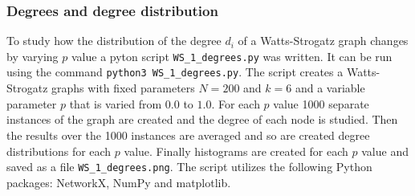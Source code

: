 \subsubsection{Degrees and degree distribution}

To study how the distribution of the degree $d_i$ of a Watts-Strogatz graph changes by varying $p$ value a pyton script \verb+WS_1_degrees.py+ was written. It can be run using the command \verb+python3 WS_1_degrees.py+. The script creates a Watts-Strogatz graphs with fixed parameters $N=200$ and $k=6$ and a variable parameter $p$ that is varied from $0.0$ to $1.0$. For each $p$ value 1000 separate instances of the graph are created and the degree of each node is studied. Then the results over the 1000 instances are averaged and so are created degree distributions for each $p$ value. Finally histograms are created for each $p$ value and saved as a file \verb+WS_1_degrees.png+. The script utilizes the following Python packages: NetworkX, NumPy and matplotlib.